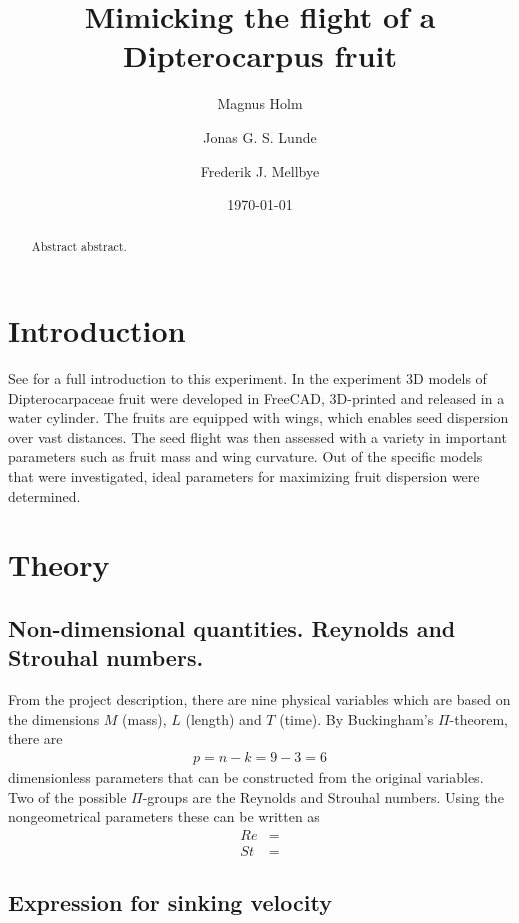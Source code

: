 \documentclass[aps,reprint]{revtex4-1}
\begin{document}
\title{Mimicking the flight of a Dipterocarpus fruit}
\author{Magnus Holm}
\author{Jonas G. S. Lunde}
\author{Frederik J. Mellbye}
\date{\today}

\begin{abstract}
Abstract abstract.
\end{abstract}
\maketitle

\section{Introduction}
\label{sec:introduction}
See \cite{instruks} for a full introduction to this experiment. In the experiment
3D models of Dipterocarpaceae fruit were developed in FreeCAD, 3D-printed and
released in a water cylinder. The fruits are equipped with wings, which enables
seed dispersion over vast distances. The seed flight was then assessed with a
variety in important parameters such as fruit mass and wing curvature. Out of the
specific models that were investigated, ideal parameters for maximizing fruit
dispersion were determined.

\section{Theory}
\label{sec:theory}
\subsection{Non-dimensional quantities. Reynolds and Strouhal numbers.}
From the project description, there are nine physical variables which are based
on the dimensions $M$ (mass), $L$ (length) and $T$ (time). By Buckingham's
$\Pi$-theorem, there are
\begin{align*}
  p = n - k = 9 - 3 = 6
\end{align*}
dimensionless parameters that can be constructed from the original variables.
Two of the possible $\Pi$-groups are the Reynolds and Strouhal numbers. Using
the nongeometrical parameters these can be written as
\begin{align}
  Re &= \\
  St &=
\end{align}
\subsection{Expression for sinking velocity}
\end{document}
